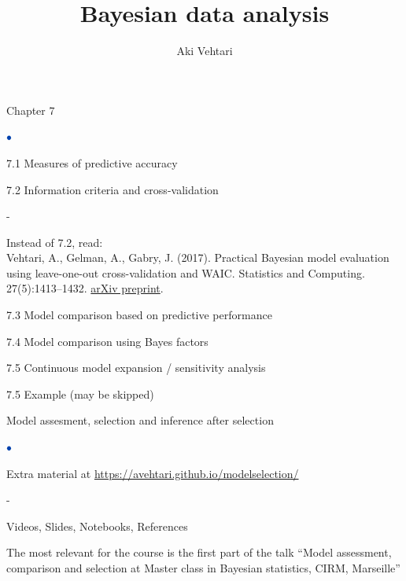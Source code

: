\documentclass[english,t]{beamer}
\title[]{Bayesian data analysis}
\subtitle{}
\author{Aki Vehtari}
\institute[Aalto]{}
\date[]{}
\newenvironment{list1}{
   \begin{list}{$\color{list1}\bullet$}{\itemsep=6pt}}{
  \end{list}}
\newenvironment{list2}{
  \begin{list}{-}{\baselineskip=12pt\itemsep=2pt}}{
  \end{list}}
\begin{document}
\begin{frame}
  
   {\Large\color{navyblue} Chapter 7}

   \begin{list1}
   \item 7.1 Measures of predictive accuracy
   \item 7.2 Information criteria and cross-validation
     \begin{list2}
     \item Instead of 7.2, read:\\
       Vehtari, A., Gelman, A., Gabry, J. (2017). Practical Bayesian
       model evaluation using leave-one-out cross-validation and
       WAIC. Statistics and Computing. 27(5):1413–1432.
       \href{http://arxiv.org/abs/1507.04544}{arXiv preprint}.
     \end{list2}
   \item 7.3 Model comparison based on predictive performance
   \item 7.4 Model comparison using Bayes factors
   \item 7.5 Continuous model expansion / sensitivity analysis
   \item 7.5 Example (may be skipped)
   \end{list1}

\end{frame}

\begin{frame}
  
   {\Large\color{navyblue} Model assesment, selection and inference after selection}

   \begin{list1}
   \item Extra material at \url{https://avehtari.github.io/modelselection/}
     \begin{list2}
       \item Videos, Slides, Notebooks, References
       \item The most relevant for the course is the first part of the
         talk ``Model assessment, comparison and selection at Master
         class in Bayesian statistics, CIRM, Marseille''
     \end{list2}
   \end{list1}

\end{frame}
\end{document}
